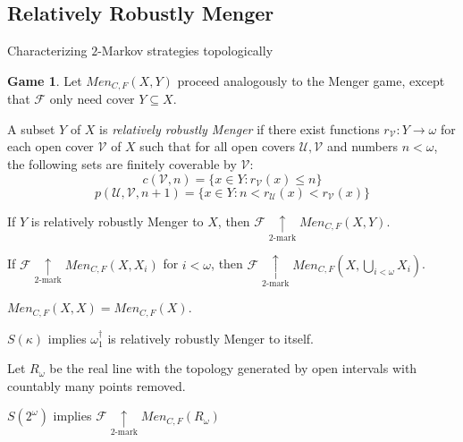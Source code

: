\documentclass{beamer}
\theoremstyle{definition}
\newtheorem{game}[theorem]{Game}
\newcommand{\kmarkwin}[1]{\underset{#1\text{-mark}}{\uparrow}}
\newcommand{\oneptlind}[1]{#1^\dagger}
\newcommand{\mengame}[1]{Men_{C,F}(#1)}
\newcommand{\<}{\langle}
\renewcommand{\>}{\rangle}
\newcommand{\mc}[1]{\mathcal{#1}}
\newcommand{\alcompS}[1]{S(#1)}
\newcommand{\pl}[1]{\mathscr{#1}}
\newcommand{\term}{\textit}
\begin{document}
\subsection{Relatively Robustly Menger}

\begin{frame}{Characterizing $2$-Markov strategies topologically}
  \begin{game}
    Let $\mengame{X,Y}$ proceed
    analogously to the Menger game, except that $\pl F$ only need
    cover $Y\subseteq X$.
  \end{game}

  \pause

  \begin{definition}
    A subset $Y$ of $X$ is \term{relatively robustly Menger} if there exist
    functions $r_{\mc V}:Y\to\omega$
    for each open cover $\mc V$ of $X$ such that
    for all open covers $\mc U,\mc V$ and numbers $n<\omega$,
    the following sets are finitely coverable by $\mc V$:
      \[
        c(\mc V,n)=\{ x\in Y : r_{\mc V}(x)\leq n\}
      \]
      \[
        p(\mc U,\mc V,n+1)=\{ x\in Y : n<r_{\mc U}(x)<r_{\mc V}(x)\}
      \]
  \end{definition}
\end{frame}

\begin{frame}
  \begin{theorem}
    If $Y$ is relatively robustly Menger to $X$, then
    $\pl F\kmarkwin2\mengame{X,Y}$.
  \end{theorem}

  \begin{theorem}
    If $\pl F\kmarkwin{2} \mengame{X,X_i}$ for $i<\omega$, then
    $\pl F\kmarkwin{2} \mengame{X,\bigcup_{i<\omega}X_i}$.
  \end{theorem}

  \begin{theorem}
    $\mengame{X,X}=\mengame{X}$.
  \end{theorem}
\end{frame}

\begin{frame}
  \begin{theorem}
    $\alcompS\kappa$ implies $\oneptlind{\omega_1}$ is relatively robustly
    Menger to itself.
  \end{theorem}

  \pause

  \begin{definition}
    Let $R_\omega$ be the real line with the topology generated by open
    intervals with countably many points removed.
  \end{definition}

  \begin{theorem}
    $\alcompS{2^\omega}$ implies $\pl F\kmarkwin2\mengame{R_\omega}$
  \end{theorem}
\end{frame}
\end{document}
